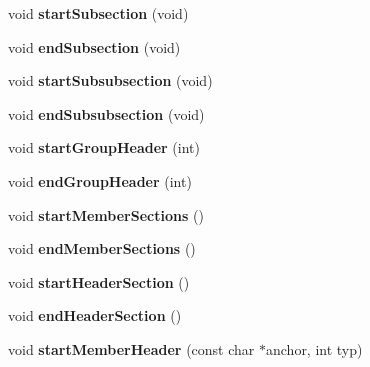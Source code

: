 \begin{DoxyCompactItemize}
void {\bfseries start\+Subsection} (void)
\item 
\mbox{\label{class_docbook_generator_a1ef185fbf941e38cb5c398fa1b91cdc1}} 
void {\bfseries end\+Subsection} (void)
\item 
\mbox{\label{class_docbook_generator_af7d9b5e9bf1a7ff6030af837ab574b95}} 
void {\bfseries start\+Subsubsection} (void)
\item 
\mbox{\label{class_docbook_generator_a0c29baba6775a956dc285964e81af254}} 
void {\bfseries end\+Subsubsection} (void)
\item 
\mbox{\label{class_docbook_generator_a07b8ca92d5e96c8991c0076f5a89f274}} 
void {\bfseries start\+Group\+Header} (int)
\item 
\mbox{\label{class_docbook_generator_a0e7adc57e7d16e6adc87dce0eb83516b}} 
void {\bfseries end\+Group\+Header} (int)
\item 
\mbox{\label{class_docbook_generator_a4e3b29c08c2340b5b87b2ef1205414b4}} 
void {\bfseries start\+Member\+Sections} ()
\item 
\mbox{\label{class_docbook_generator_a742b6c6bf05b83f068339d9cf14dc93b}} 
void {\bfseries end\+Member\+Sections} ()
\item 
\mbox{\label{class_docbook_generator_a95adf7ec16fbeb183330ecb676a0c177}} 
void {\bfseries start\+Header\+Section} ()
\item 
\mbox{\label{class_docbook_generator_a5fb9718a207e7313bbeac60cac9e32ee}} 
void {\bfseries end\+Header\+Section} ()
\item 
\mbox{\label{class_docbook_generator_afd617230ccfacc6e34851652e9bab6c2}} 
void {\bfseries start\+Member\+Header} (const char $\ast$anchor, int typ)
\item 
\mbox{\label{class_docbook_generator_a29959b53028bcdf2e21067a096e3fe77}} 

\end{DoxyCompactItemize}
